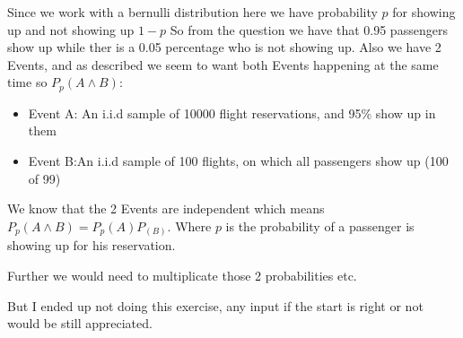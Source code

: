 Since we work with a bernulli distribution here we have probability $p$ for showing up and not showing up $1-p$
So from the question we have that 0.95 passengers show up while ther is a 0.05 percentage who is not showing up.
Also we have 2 Events, and as described we seem to want both Events happening at the same time so $P_p(A\wedge B)$:

\begin{itemize}
	\item Event A: An i.i.d sample of 10000 flight reservations, and 95\% show up in them
	\item Event B:An i.i.d sample of 100 flights, on which all passengers show up (100 of 99)	
\end{itemize}

We know that the 2 Events are independent which means $P_p(A\wedge B) = P_p(A)P_(B)$.
Where $p$ is the probability of a passenger is showing up for his reservation.

Further we would need to multiplicate those 2 probabilities etc.

But I ended up not doing this exercise, any input if the start is right or not would be still appreciated.
